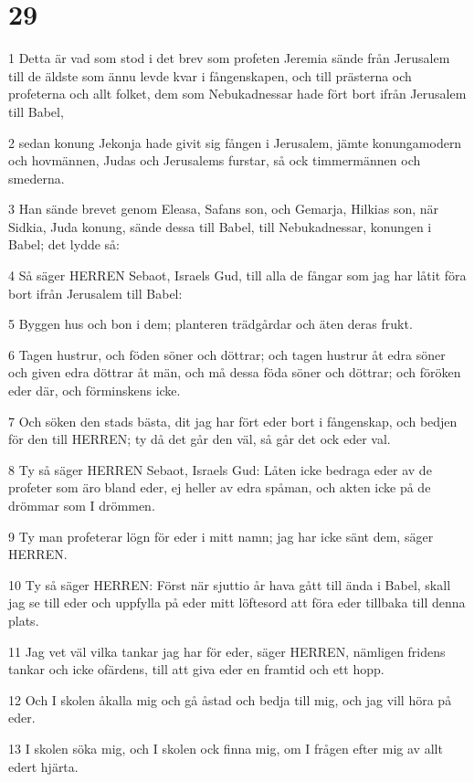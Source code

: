 \chapter{29}

\par 1 Detta är vad som stod i det brev som profeten Jeremia sände från Jerusalem till de äldste som ännu levde kvar i fångenskapen, och till prästerna och profeterna och allt folket, dem som Nebukadnessar hade fört bort ifrån Jerusalem till Babel,
\par 2 sedan konung Jekonja hade givit sig fången i Jerusalem, jämte konungamodern och hovmännen, Judas och Jerusalems furstar, så ock timmermännen och smederna.
\par 3 Han sände brevet genom Eleasa, Safans son, och Gemarja, Hilkias son, när Sidkia, Juda konung, sände dessa till Babel, till Nebukadnessar, konungen i Babel; det lydde så:
\par 4 Så säger HERREN Sebaot, Israels Gud, till alla de fångar som jag har låtit föra bort ifrån Jerusalem till Babel:
\par 5 Byggen hus och bon i dem; planteren trädgårdar och äten deras frukt.
\par 6 Tagen hustrur, och föden söner och döttrar; och tagen hustrur åt edra söner och given edra döttrar åt män, och må dessa föda söner och döttrar; och föröken eder där, och förminskens icke.
\par 7 Och söken den stads bästa, dit jag har fört eder bort i fångenskap, och bedjen för den till HERREN; ty då det går den väl, så går det ock eder val.
\par 8 Ty så säger HERREN Sebaot, Israels Gud: Låten icke bedraga eder av de profeter som äro bland eder, ej heller av edra spåman, och akten icke på de drömmar som I drömmen.
\par 9 Ty man profeterar lögn för eder i mitt namn; jag har icke sänt dem, säger HERREN.
\par 10 Ty så säger HERREN: Först när sjuttio år hava gått till ända i Babel, skall jag se till eder och uppfylla på eder mitt löftesord att föra eder tillbaka till denna plats.
\par 11 Jag vet väl vilka tankar jag har för eder, säger HERREN, nämligen fridens tankar och icke ofärdens, till att giva eder en framtid och ett hopp.
\par 12 Och I skolen åkalla mig och gå åstad och bedja till mig, och jag vill höra på eder.
\par 13 I skolen söka mig, och I skolen ock finna mig, om I frågen efter mig av allt edert hjärta.
